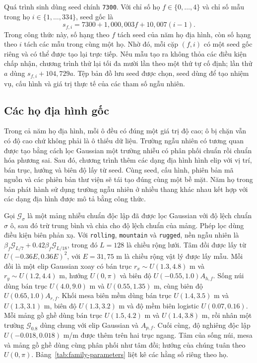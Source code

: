 \documentclass[11pt]{article}
\begin{document}
Quá trình sinh dùng seed chính \texttt{7300}. Với chỉ số họ
$f\in\{0,\ldots,4\}$ và chỉ số mẫu trong họ
$i\in\{1,\ldots,334\}$, seed gốc là
\begin{equation}
  s_{f,i}=7300+1{,}000{,}003f+10{,}007(i-1).
\end{equation}
Trong công thức này, số hạng theo $f$ tách seed của năm họ địa hình, còn số
hạng theo $i$ tách các mẫu trong cùng một họ. Nhờ đó, mỗi cặp $(f,i)$ có một
seed gốc riêng và có thể được tạo lại trực tiếp.
Nếu mẫu tạo ra không thỏa các điều kiện chấp nhận, chương trình thử lại tối đa
mười lần theo một thứ tự cố định; lần thử $a$ dùng $s_{f,i}+104{,}729a$. Tệp
bản đồ lưu seed được chọn, seed dùng để tạo nhiệm vụ, cấu hình và giá trị thực
tế của các tham số ngẫu nhiên.

\subsection{Các họ địa hình gốc}

Trong cả năm họ địa hình, mỗi ô đều có đúng một giá trị độ cao; ô bị chặn vẫn
có độ cao chứ không phải là ô thiếu dữ liệu. Trường ngẫu nhiên có tương quan
được tạo bằng cách lọc Gaussian một trường nhiễu có phân phối chuẩn rồi chuẩn
hóa phương sai. Sau đó, chương trình thêm các dạng địa hình hình elip với vị
trí, bán trục, hướng và biên độ lấy từ seed. Cùng seed, cấu hình, phiên bản mã nguồn và các
phiên bản thư viện sẽ tái tạo đúng cùng một bề mặt. Năm họ trong bản phát hành
sử dụng trường ngẫu nhiên ở nhiều thang khác nhau kết hợp với các dạng địa hình
được mô tả bằng công thức.

Gọi $\mathcal{G}_{\sigma}$ là một mảng nhiễu chuẩn độc lập đã được lọc Gaussian
với độ lệch chuẩn $\sigma$ ô, sau đó trừ trung bình và chia cho độ lệch chuẩn
của mảng. Phép lọc dùng điều kiện biên phản xạ. Với \texttt{rolling},
\texttt{mountain} và \texttt{rugged}, nền ngẫu nhiên là
$\beta_f\mathcal{G}_{L/7}+0.42\beta_f\mathcal{G}_{L/18}$, trong đó $L=128$ là
chiều rộng lưới. Tâm đồi được lấy từ $U(-0.36E,0.36E)^2$, với $E=31{,}75$ m là
chiều rộng vật lý được lấy mẫu. Mỗi đồi là một elip Gaussian xoay có bán trục
$r_x\sim U(1.3,4.8)$ m và $r_y\sim U(1.2,4.4)$ m, hướng $U(0,\pi)$ và biên độ
$U(-0.55,1.0)A_{h,f}$. Sống núi dùng bán trục $U(4.0,9.0)$ m và
$U(0.55,1.35)$ m, cùng biên độ $U(0.65,1.0)A_{r,f}$. Khối mesa biên mềm dùng
bán trục $U(1.4,3.5)$ m và $U(1.3,3.1)$ m, biên độ $U(1.3,3.2)$ m và độ mềm
biên logistic $U(0.07,0.16)$. Mỗi mảng gồ ghề dùng bán trục $U(1.5,4.2)$ m và
$U(1.4,3.8)$ m, rồi nhân một trường $\mathcal{G}_{0.8}$ dùng chung với elip
Gaussian và $A_{p,f}$. Cuối cùng, độ nghiêng độc lập $U(-0.018,0.018)$ m/m được
thêm trên hai trục ngang. Tâm của sống núi, mesa và mảng gồ ghề dùng cùng phân
phối như tâm đồi; hướng của chúng tuân theo $U(0,\pi)$.
Bảng~\ref{tab:family-parameters} liệt kê các hằng số riêng theo họ.
\end{document}
